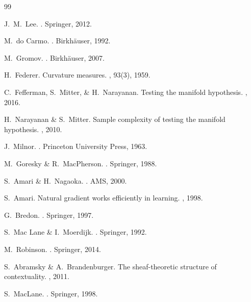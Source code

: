 \documentclass[11pt,a4paper,twocolumn]{article}
\begin{document}
\begin{thebibliography}{99}

J.~M.~Lee.
.
\newblock Springer, 2012.

M.~do Carmo.
.
\newblock Birkhäuser, 1992.

M.~Gromov.
.
\newblock Birkhäuser, 2007.

H.~Federer.
\newblock Curvature measures.
, 93(3), 1959.

C.~Fefferman, S.~Mitter, \& H.~Narayanan.
\newblock Testing the manifold hypothesis.
, 2016.

H.~Narayanan \& S.~Mitter.
\newblock Sample complexity of testing the manifold hypothesis.
, 2010.

J.~Milnor.
.
\newblock Princeton University Press, 1963.

M.~Goresky \& R.~MacPherson.
.
\newblock Springer, 1988.

S.~Amari \& H.~Nagaoka.
.
\newblock AMS, 2000.

S.~Amari.
\newblock Natural gradient works efficiently in learning.
, 1998.

G.~Bredon.
.
\newblock Springer, 1997.

S.~Mac Lane \& I.~Moerdijk.
.
\newblock Springer, 1992.

M.~Robinson.
.
\newblock Springer, 2014.

S.~Abramsky \& A.~Brandenburger.
\newblock The sheaf-theoretic structure of contextuality.
, 2011.

S.~MacLane.
.
\newblock Springer, 1998.


\end{thebibliography}
\end{document}
